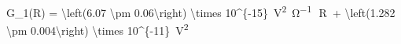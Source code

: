 G_1(R) = \SI[parse-numbers = false]{\left(6.07 \pm 0.06\right) \times 10^{-15}}{\volt^2\per\ohm}\, \cdot \,R\, + \SI[parse-numbers = false]{\left(1.282 \pm 0.004\right) \times 10^{-11}}{\volt^2}